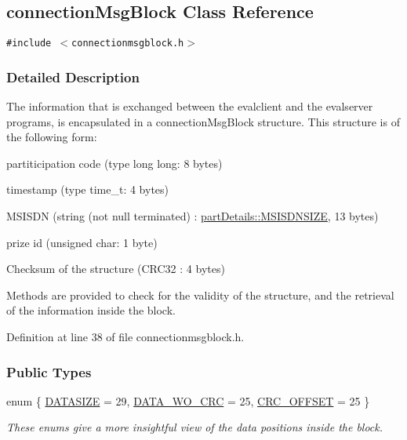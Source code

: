 \hypertarget{classconnectionMsgBlock}{
\subsection{connection\-Msg\-Block Class Reference}
\label{classconnectionMsgBlock}
}
{\tt \#include $<$connectionmsgblock.h$>$}



\subsubsection{Detailed Description}
The information that is exchanged between the evalclient and the evalserver programs, is encapsulated in a connection\-Msg\-Block structure. This structure is of the following form:

\begin{CompactItemize}
\item 
partiticipation code (type long long: 8 bytes)\item 
timestamp (type time\_\-t: 4 bytes)\item 
MSISDN (string (not null terminated) : \hyperlink{classpartDetails_partDetailss1partDetailss0}{part\-Details::MSISDNSIZE}, 13 bytes)\item 
prize id (unsigned char: 1 byte)\item 
Checksum of the structure (CRC32 : 4 bytes)\end{CompactItemize}
Methods are provided to check for the validity of the structure, and the retrieval of the information inside the block. 



Definition at line 38 of file connectionmsgblock.h.\subsubsection*{Public Types}
\begin{CompactItemize}
\item 
enum \{ \hyperlink{classconnectionMsgBlock_connectionMsgBlocks3connectionMsgBlocks0}{DATASIZE} =  29, 
\hyperlink{classconnectionMsgBlock_connectionMsgBlocks3connectionMsgBlocks1}{DATA\_\-WO\_\-CRC} =  25, 
\hyperlink{classconnectionMsgBlock_connectionMsgBlocks3connectionMsgBlocks2}{CRC\_\-OFFSET} =  25
 \}
\begin{CompactList}\small\item\em These enums give a more insightful view of the data positions inside the block.\item\end{CompactList}\end{CompactItemize}
